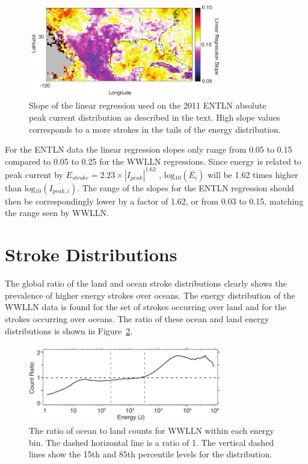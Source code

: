 \begin{figure}[ht!]
   \centering
   \noindent\includegraphics[width=20pc]{LandSea/Figures/4_regMapENTLN.pdf} 
   \caption{Slope of the linear regression used on the 2011 ENTLN absolute peak current distribution as described in the text.
        High slope values corresponds to a more strokes in the tails of the energy distribution.}
   \label{landsea:fig:regMapENTLN}
\end{figure}

For the ENTLN data the linear regression slopes only range from 0.05 to 0.15 compared to 0.05 to 0.25 for the WWLLN regressions.
Since energy is related to peak current by $E_{stroke} = 2.23 \times | I_{peak} | ^{1.62}$ \citep{Hutchins2012}, $\text{log$_{10}$}(\overline{E_i})$ will be 1.62 times higher than $\text{log$_{10}$}(\overline{I_{peak,i}})$.
The range of the slopes for the ENTLN regression should then be correspondingly lower by a factor of 1.62, or from 0.03 to 0.15, matching the range seen by WWLLN.

\section{Stroke Distributions}

The global ratio of the land and ocean stroke distributions clearly shows the prevalence of higher energy strokes over oceans.
The energy distribution of the WWLLN data is found for the set of strokes occurring over land and for the strokes occurring over oceans.
The ratio of these ocean and land energy distributions is shown in Figure~\ref{landsea:fig:ratioComp}.

\begin{figure}[ht!]
   \centering
   \noindent\includegraphics[width=20pc]{LandSea/Figures/5_distribution.pdf} 
   \caption{The ratio of ocean to land counts for WWLLN within each energy bin. The dashed horizontal line is a ratio of 1. The vertical dashed lines show the 15th and 85th percentile levels for the distribution.}
   \label{landsea:fig:ratioComp}
\end{figure}


